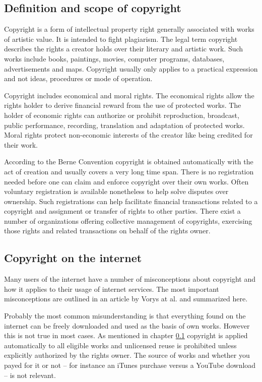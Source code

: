 \documentclass[a4paper]{report}
\begin{document}
\subsection{Definition and scope of copyright}
\label{sec:CopyDef}
Copyright is a form of intellectual property right generally associated with works of artistic value. It is intended to fight plagiarism. The legal term copyright describes the rights a creator holds over their literary and artistic work. Such works include books, paintings, movies, computer programs, databases, advertisements and maps. Copyright usually only applies to a practical expression and not ideas, procedures or mode of operation. \parencite{CopyGov}

Copyright includes economical and moral rights. The economical rights allow the rights holder to derive financial reward from the use of protected works. The holder of economic rights can authorize or prohibit reproduction, broadcast, public performance, recording, translation and adaptation of protected works. Moral rights protect non-economic interests of the creator like being credited for their work. \parencite{WikiCopy}

According to the Berne Convention copyright is obtained automatically with the act of creation and usually covers a very long time span. \parencite{WikiBerne} There is no registration needed before one can claim and enforce copyright over their own works. Often voluntary registration is available nonetheless to help solve disputes over ownership. Such registrations can help facilitate financial transactions related to a copyright and assignment or transfer of rights to other parties. There exist a number of organizations offering collective management of copyrights, exercising those rights and related transactions on behalf of the rights owner.

\subsection{Copyright on the internet}
Many users of the internet have a number of misconceptions about copyright and how it applies to their usage of internet services. The most important misconceptions are outlined in an article by Vorys at al. \parencite{Vorys2013} and summarized here.

Probably the most common misunderstanding is that everything found on the internet can be freely downloaded and used as the basis of own works. However this is not true in most cases. As mentioned in chapter \ref{sec:CopyDef} copyright is applied automatically to all eligible works and unlicensed reuse is prohibited unless explicitly authorized by the rights owner. The source of works and whether you payed for it or not -- for instance an iTunes purchase versus a YouTube download -- is not relevant.
\end{document}
